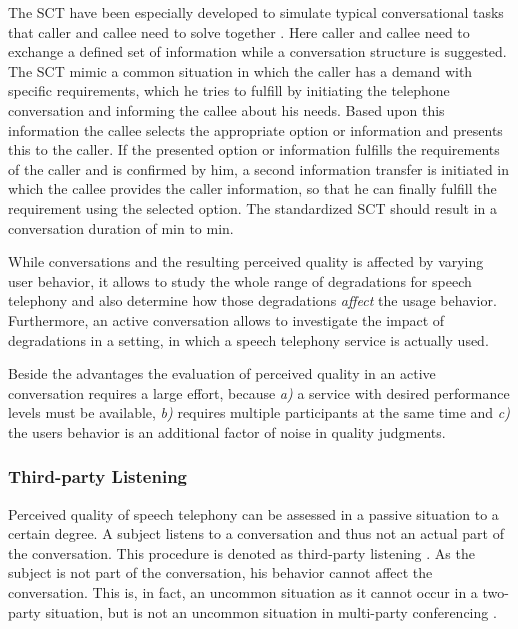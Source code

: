 The \acf{SCT} have been especially developed to simulate typical conversational tasks that caller and callee need to solve together \cite[\cf,][p. 76]{moller_assessment_2000}.
Here caller and callee need to exchange a defined set of information while a conversation structure is suggested.
The \ac{SCT} mimic a common situation in which the caller has a demand with specific requirements, which he tries to fulfill by initiating the telephone conversation and informing the callee about his needs.
Based upon this information the callee selects the appropriate option or information and presents this to the caller.
If the presented option or information fulfills the requirements of the caller and is confirmed by him, a second information transfer is initiated in which the callee provides the caller information, so that he can finally fulfill the requirement using the selected option.
The standardized \acs{SCT} \citep{itu-t_p.805:_2007} should result in a conversation duration of \unit[3]{min} to \unit[7]{min}.

While conversations and the resulting perceived quality is affected by varying user behavior, it allows to study the whole range of degradations for speech telephony and also determine how those degradations \emph{affect} the usage behavior.
Furthermore, an active conversation allows to investigate the impact of degradations in a setting, in which a speech telephony service is actually used.

Beside the advantages the evaluation of perceived quality in an active conversation requires a large effort, because \emph{a)} a service with desired performance levels must be available, \emph{b)} requires multiple participants at the same time and \emph{c)} the users behavior is an additional factor of noise in quality judgments.

\subsubsection{Third-party Listening}
Perceived quality of speech telephony can be assessed in a passive situation to a certain degree.
A subject listens to a conversation and thus not an actual part of the conversation.
This procedure is denoted as third-party listening \citep[\cf, ][p. 13]{itu-t_p.832:_2000}.
As the subject is not part of the conversation, his behavior cannot affect the conversation.
This is, in fact, an uncommon situation as it cannot occur in a two-party situation, but is not an uncommon situation in multi-party conferencing .

